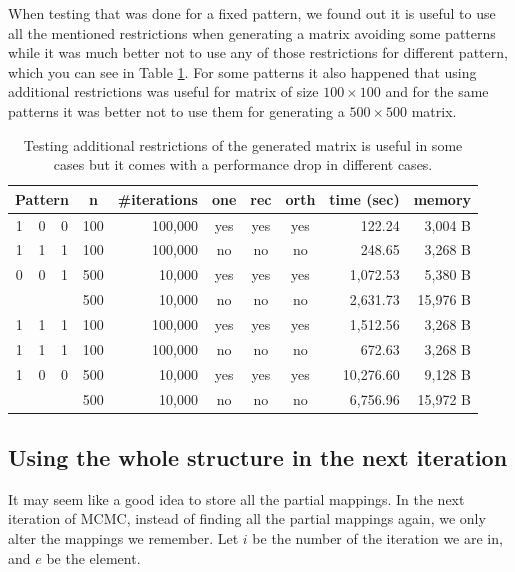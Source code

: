 When testing that was done for a fixed pattern, we found out it is useful to use all the mentioned restrictions when generating a matrix avoiding some patterns while it was much better not to use any of those restrictions for different pattern, which you can see in Table \ref{approachestable}. For some patterns it also happened that using additional restrictions was useful for matrix of size $100\times100$ and for the same patterns it was better not to use them for generating a $500\times500$ matrix.
\begin{table}[]
\centering
\begin{tabular}{|ccc|c|r|c|c|c|r|r|}
\hline
\multicolumn{3}{|c|}{\textbf{Pattern}} & \textbf{n} & \textbf{\#iterations} & \textbf{one} & \textbf{rec} & \textbf{orth} & \textbf{time (sec)} & \textbf{memory} \\ \hline
1 & 0 & 0 & 100 & 100,000 & yes & yes & yes & 122.24 & 3,004 B \\ \cline{4-10} 
1 & 1 & 1 & 100 & 100,000 & no & no & no & 248.65 & 3,268 B \\ \cline{4-10} 
0 & 0 & 1 & 500 & 10,000 & yes & yes & yes & 1,072.53 & 5,380 B \\ \cline{4-10} 
  &   &   & 500 & 10,000 & no & no & no & 2,631.73 & 15,976 B \\ \hline
1 & 1 & 1 & 100 & 100,000 & yes & yes & yes & 1,512.56 & 3,268 B \\ \cline{4-10}
1 & 1 & 1 & 100 & 100,000 & no & no & no & 672.63 & 3,268 B \\ \cline{4-10} 
1 & 0 & 0 & 500 & 10,000 & yes & yes & yes & 10,276.60 & 9,128 B \\ \cline{4-10} 
  &   &   & 500 & 10,000 & no & no & no & 6,756.96 & 15,972 B \\ \hline
\end{tabular}
\caption{Testing additional restrictions of the generated matrix is useful in some cases but it comes with a performance drop in different cases.}
\label{approachestable}
\end{table}

\subsection{Using the whole structure in the next iteration}
\label{wholestructure}
It may seem like a good idea to store all the partial mappings. In the next iteration of MCMC, instead of finding all the partial mappings again, we only alter the mappings we remember. Let $i$ be the number of the iteration we are in, and $e$ be the element.

